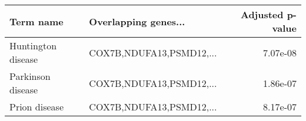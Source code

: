 \begin{tabular}{llr}
\toprule
         Term name &     Overlapping genes... &  Adjusted p-value \\
\midrule
Huntington disease & COX7B,NDUFA13,PSMD12,... &          7.07e-08 \\
 Parkinson disease & COX7B,NDUFA13,PSMD12,... &          1.86e-07 \\
     Prion disease & COX7B,NDUFA13,PSMD12,... &          8.17e-07 \\
\bottomrule
\end{tabular}
